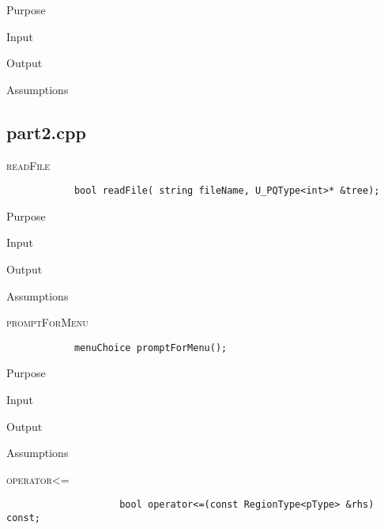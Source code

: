 \documentclass[pdftex, 12pt]{article}
\begin{document}
\begin{description}
\begin{description}
			\item{Purpose}

			\item{Input}

			\item{Output}

			\item{Assumptions}

		\end{description}
\end{description}
\subsection{part2.cpp}
\begin{description}
	\item{\textsc{readFile}}
		\begin{lstlisting}
			bool readFile( string fileName, U_PQType<int>* &tree);
		\end{lstlisting}
		\begin{description}

			\item{Purpose}

			\item{Input}

			\item{Output}

			\item{Assumptions}

		\end{description}
	\item{\textsc{promptForMenu}}
		\begin{lstlisting}
			menuChoice promptForMenu();
		\end{lstlisting}
		\begin{description}

			\item{Purpose}

			\item{Input}

			\item{Output}

			\item{Assumptions}

		\end{description}

	\item{\textsc{operator<=}}
		\begin{description}
				\begin{lstlisting}
					bool operator<=(const RegionType<pType> &rhs) const;
				\end{lstlisting}


\end{description}
\end{description}
\end{document}
